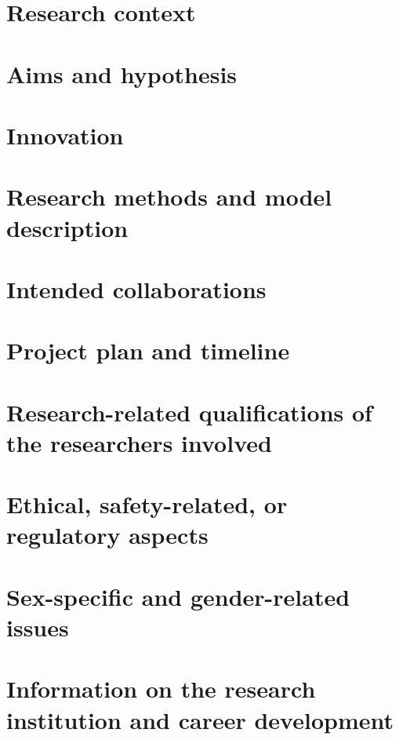 \documentclass[11pt, a4paper, oneside, article]{memoir}
\begin{document}
\setlength{\baselineskip}{15pt}         %



\frontmatter
\tableofcontents*

\mainmatter
\chapter{Research context}
\label{c:context}


\chapter{Aims and hypothesis}
\label{c:aim_hyp}


\chapter{Innovation}


\chapter{Research methods and model description}


\chapter{Intended collaborations}


\chapter{Project plan and timeline}


\chapter{Research-related qualifications of the researchers involved}


\chapter{Ethical, safety-related, or regulatory aspects}


\chapter{Sex-specific and gender-related issues}


\chapter{Information on the research institution and career development}
\label{c:info_dev}


\vfill


\appendix
\printglossaries

\newpage
\printbibliography[env=bibliography]
\end{document}
